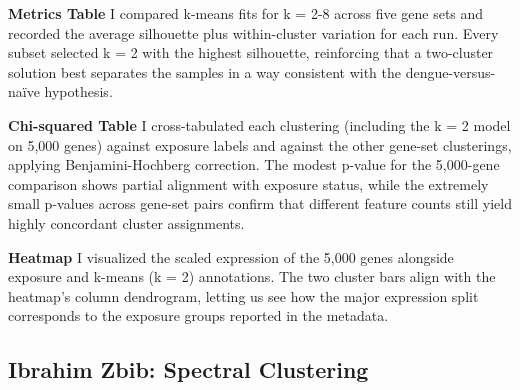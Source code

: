 \documentclass[
]{article}
\begin{document}
\textbf{Metrics Table} I compared k-means fits for k = 2-8 across five
gene sets and recorded the average silhouette plus within-cluster
variation for each run. Every subset selected k = 2 with the highest
silhouette, reinforcing that a two-cluster solution best separates the
samples in a way consistent with the dengue-versus-naïve hypothesis.

\textbf{Chi-squared Table} I cross-tabulated each clustering (including
the k = 2 model on 5,000 genes) against exposure labels and against the
other gene-set clusterings, applying Benjamini-Hochberg correction. The
modest p-value for the 5,000-gene comparison shows partial alignment
with exposure status, while the extremely small p-values across gene-set
pairs confirm that different feature counts still yield highly
concordant cluster assignments.

\textbf{Heatmap} I visualized the scaled expression of the 5,000 genes
alongside exposure and k-means (k = 2) annotations. The two cluster bars
align with the heatmap's column dendrogram, letting us see how the major
expression split corresponds to the exposure groups reported in the
metadata.

\subsection{Ibrahim Zbib: Spectral
Clustering}\label{ibrahim-zbib-spectral-clustering}
\end{document}
